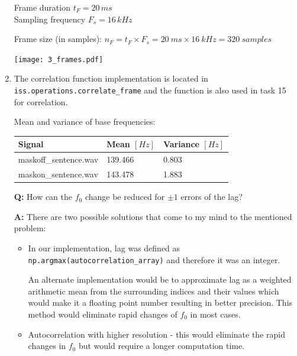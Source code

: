 \documentclass[a4paper, 11pt]{article}
\begin{document}
\begin{enumerate}
        Frame duration $t_F = 20\,ms$ \\
        Sampling frequency $F_s = 16\,kHz$

        Frame size (in samples): $n_F = t_F \times F_s = 20~ms \times 16~kHz = 320~samples$

        \texttt{[image: 3\_frames.pdf]}

        \vspace{2mm}
        \item
        The correlation function implementation is located in \texttt{iss.operations.correlate\_frame}
        and the function is also used in task 15 for correlation.

        Mean and variance of base frequencies: \\
        \begin{tabular}{ | l | l | l | }
            \hline
            \textbf{Signal}       & \textbf{Mean} $[Hz]$ & \textbf{Variance} $[Hz]$ \\ \hline
            maskoff\_sentence.wav & 139.466              & 0.803                    \\ \hline
            maskon\_sentence.wav  & 143.478              & 1.883                    \\ \hline
        \end{tabular}

        \vspace{2mm}
        \textbf{Q:} How can the $f_0$ change be reduced for $\pm1$ errors of the lag?

        \textbf{A:} There are two possible solutions that come to my mind to the mentioned problem:

        \begin{itemize}
            \item
            In our implementation, lag was defined as \texttt{np.argmax(autocorrelation\_array)} and therefore it was an integer.

            An alternate implementation would be to approximate lag as a weighted arithmetic mean from the surrounding indices and their values
            which would make it a floating point number resulting in better precision.
            This method would eliminate rapid changes of $f_0$ in most cases.

            \item
            Autocorrelation with higher resolution - this would eliminate the rapid changes in $f_0$
            but would require a longer computation time.
        \end{itemize}


\end{enumerate}
\end{document}
